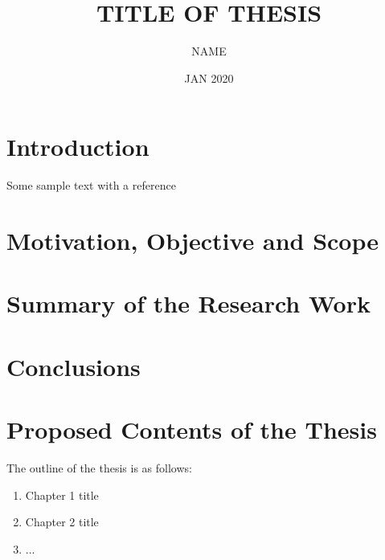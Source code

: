 \documentclass[PhD,synopsis]{iitmdiss}
\title{TITLE OF THESIS}
\author{NAME}
\date{JAN 2020}
\begin{document}
\maketitle


\setcounter{page}{0}
\section{Introduction}

Some sample text with a reference 

\section{Motivation, Objective and Scope}

\section{Summary of the Research Work}

\section{Conclusions}



\begin{singlespace}
%

\end{singlespace}




\section{Proposed Contents of the Thesis}
The outline of the thesis is as follows:
\begin{enumerate}
\item Chapter 1 title
\item Chapter 2 title
\item ...
\end{enumerate}
\end{document}
